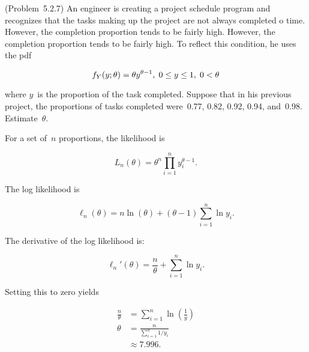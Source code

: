 \begin{problem}
  (\textnormal{Problem~5.2.7}) An engineer is creating a project schedule program and recognizes that the tasks making up the project are not always completed o time.  However, the completion proportion tends to be fairly high.  However, the completion proportion tends to be fairly high.  To reflect this condition, he uses the pdf

  \begin{equation}\label{eq:P04}
    f_{Y}(y;\theta)=\theta y^{\theta - 1}, \hspace{0.1cm} 0 \leq y \leq 1, \hspace{0.1cm} 0 < \theta
  \end{equation}

  \noindent
  where $y$~is the proportion of the task completed.  Suppose that in his previous project, the proportions of tasks completed were~0.77, 0.82, 0.92, 0.94, and~0.98.  Estimate~$\theta$.
\end{problem}

For a set of~$n$ proportions, the likelihood is

\begin{equation}\label{eq:P04:Likelihood}
  L_{n}(\theta) = \theta^{n} \prod_{i=1}^{n} y_{i}^{\theta - 1} \text{.}
\end{equation}

\noindent
The log likelihood is

\begin{equation}\label{eq:P04:LogLikelihood}
  \ell_{n}(\theta) = n\ln(\theta) + (\theta - 1) \sum_{i=1}^{n} \ln y_i \text{.}
\end{equation}

\noindent
The derivative of the log likelihood is:

\begin{equation}\label{eq:P04:LogLikelihood:Deriv}
  \ell_{n}'(\theta) = \frac{n}{\theta} + \sum_{i=1}^{n} \ln y_i \text{.}
\end{equation}

\noindent
Setting this to zero yields

\begin{align}
  \frac{n}{\theta} &= \sum_{i=1}^{n} \ln\left(\frac{1}{y} \right) \\
  \theta &= \frac{n}{\sum_{i=1}^{n} 1 / y_i} \\
         &\approx \boxed{7.996} \text{.}
\end{align}
